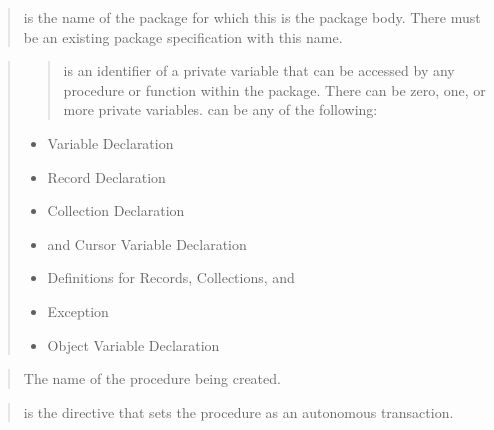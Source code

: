 \documentclass[letterpaper,10pt,english,openany,oneside]{sphinxmanual}
\begin{document}

\begin{quote}

 is the name of the package for which this is the
package body. There must be an existing package specification with
this name.
\end{quote}

\begin{quote}
\begin{quote}

 is an identifier of a private variable that
can be accessed by any procedure or function within the package.
There can be zero, one, or more private variables.
 can be any of the following:
\end{quote}
\begin{itemize}
\item {} 
Variable Declaration

\item {} 
Record Declaration

\item {} 
Collection Declaration

\item {} 
 and Cursor Variable Declaration

\item {} 
 Definitions for Records, Collections, and 

\item {} 
Exception

\item {} 
Object Variable Declaration

\end{itemize}
\end{quote}

\begin{quote}

The name of the procedure being created.
\end{quote}

\begin{quote}

 is the directive that sets the procedure
as an autonomous transaction.
\end{quote}
\end{document}
